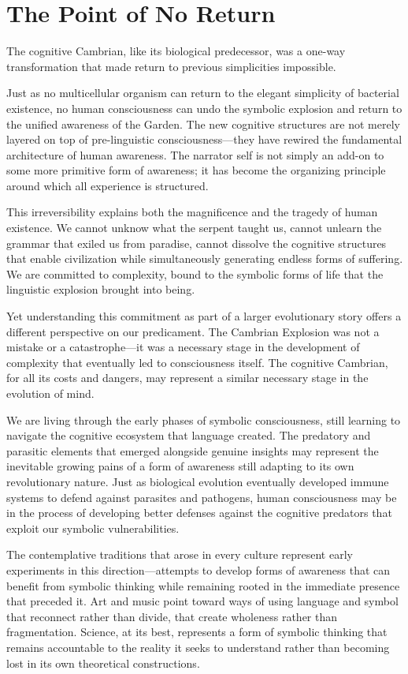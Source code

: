 \section{The Point of No Return}

The cognitive Cambrian, like its biological predecessor, was a one-way transformation that made return to previous simplicities impossible.

Just as no multicellular organism can return to the elegant simplicity of bacterial existence, no human consciousness can undo the symbolic explosion and return to the unified awareness of the Garden. The new cognitive structures are not merely layered on top of pre-linguistic consciousness—they have rewired the fundamental architecture of human awareness. The narrator self is not simply an add-on to some more primitive form of awareness; it has become the organizing principle around which all experience is structured.

This irreversibility explains both the magnificence and the tragedy of human existence. We cannot unknow what the serpent taught us, cannot unlearn the grammar that exiled us from paradise, cannot dissolve the cognitive structures that enable civilization while simultaneously generating endless forms of suffering. We are committed to complexity, bound to the symbolic forms of life that the linguistic explosion brought into being.

Yet understanding this commitment as part of a larger evolutionary story offers a different perspective on our predicament. The Cambrian Explosion was not a mistake or a catastrophe—it was a necessary stage in the development of complexity that eventually led to consciousness itself. The cognitive Cambrian, for all its costs and dangers, may represent a similar necessary stage in the evolution of mind.

We are living through the early phases of symbolic consciousness, still learning to navigate the cognitive ecosystem that language created. The predatory and parasitic elements that emerged alongside genuine insights may represent the inevitable growing pains of a form of awareness still adapting to its own revolutionary nature. Just as biological evolution eventually developed immune systems to defend against parasites and pathogens, human consciousness may be in the process of developing better defenses against the cognitive predators that exploit our symbolic vulnerabilities.

The contemplative traditions that arose in every culture represent early experiments in this direction—attempts to develop forms of awareness that can benefit from symbolic thinking while remaining rooted in the immediate presence that preceded it. Art and music point toward ways of using language and symbol that reconnect rather than divide, that create wholeness rather than fragmentation. Science, at its best, represents a form of symbolic thinking that remains accountable to the reality it seeks to understand rather than becoming lost in its own theoretical constructions.

